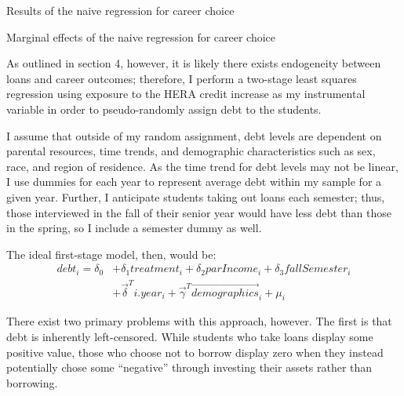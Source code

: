 \documentclass[12pt]{article}
\newcommand{\regs}{../Analysis/Regressions/Output/}
\begin{document}
	
	\begin{table}
		\centering
		\caption{Results of the naive regression for career choice}
		\resizebox{\textwidth}{!}{
			
		}
		\label{naive2}
	\end{table}

	\begin{table}
		\centering
		\caption{Marginal effects of the naive regression for career choice}
		\resizebox{\textwidth}{!}{
			
		}
		\label{naive2marg}
	\end{table}
	
	As outlined in section 4, however, it is likely there exists endogeneity between loans and career outcomes; therefore, I perform a two-stage least squares regression using exposure to the HERA credit increase as my instrumental variable in order to pseudo-randomly assign debt to the students. 
	
	I assume that outside of my random assignment, debt levels are dependent on parental resources, time trends, and demographic characteristics such as sex, race, and region of residence. As the time trend for debt levels may not be linear, I use dummies for each year to represent average debt within my sample for a given year. Further, I anticipate students taking out loans each semester; thus, those interviewed in the fall of their senior year would have less debt than those in the spring, so I include a semester dummy as well.
	
	The ideal first-stage model, then, would be: 
	\begin{equation}
	\begin{aligned}
	debt_i = \delta_0 &+ \delta_1 treatment_i + \delta_2 parIncome_i + \delta_3 fallSemester_i \\
	&+ \vec{\delta}^T i.year_i + \vec{\gamma}^T \vec{demographics}_i + \mu_i \label{fseq}
	\end{aligned}
	\end{equation}
	
	There exist two primary problems with this approach, however. The first is that debt is inherently left-censored. While students who take loans display some positive value, those who choose not to borrow display zero when they instead potentially chose some ``negative'' through investing their assets rather than borrowing. 
	
\end{document}
